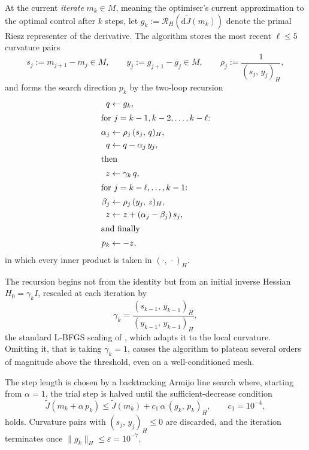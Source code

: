 \documentclass[a4paper,11pt]{article}
\newcommand{\inner}[3]{(#1,\,#2)_{#3}}        %
\newcommand{\Rmap}{\mathcal{R}}              %
\newcommand{\Jt}{\tilde{J}}                  %
\newcommand{\Mspace}{M}
\theoremstyle{spacedplain} \newtheorem{theorem}[counter]{Theorem} \newtheorem{lemma}[counter]{Lemma} \newtheorem{prop}[counter]{Proposition} \newtheorem{cor}[counter]{Corollary}
\theoremstyle{spaceddefinition} \newtheorem{defn}[counter]{Definition} \newtheorem{example}[counter]{Example} \newtheorem{remark}[counter]{Remark}
\begin{document}
At the current \emph{iterate} $m_{k} \in \Mspace$, meaning the optimiser's current approximation to the optimal control after $k$ steps, let $g_{k} := \Rmap_H(\mathrm{d}\Jt(m_{k}))$ denote the primal Riesz representer of the derivative. The algorithm stores the most recent $\ell \le 5$ curvature pairs
\begin{equation}
  s_{j} := m_{j+1} - m_{j} \in \Mspace,
  \qquad
  y_{j} := g_{j+1} - g_{j} \in \Mspace,
  \qquad
  \rho_{j} := \frac{1}{\inner{s_{j}}{y_{j}}{H}},
\end{equation}
and forms the search direction $p_k$ by the two-loop recursion
\begin{align}
  q & \leftarrow g_{k}, \\
  \intertext{for $j = k-1, k-2, \ldots, k-\ell$:}
  \alpha_{j} & \leftarrow \rho_{j}\, \inner{s_{j}}{q}{H}, \\
  q          & \leftarrow q - \alpha_{j}\, y_{j}, \\
  \intertext{then}
  z          & \leftarrow \gamma_{k}\, q, \\
  \intertext{for $j = k-\ell, \ldots, k-1$:}
  \beta_{j}  & \leftarrow \rho_{j}\, \inner{y_{j}}{z}{H}, \\
  z          & \leftarrow z + (\alpha_{j} - \beta_{j})\, s_{j}, \\
  \intertext{and finally}
  p_{k}      & \leftarrow -z,
\end{align}
in which every inner product is taken in $\inner{\cdot}{\cdot}{H}$.

The recursion begins not from the identity but from an initial inverse Hessian $H_{0} = \gamma_{k} I$, rescaled at each iteration by
\begin{equation}
  \label{eq:meshdep:gamma_k}
  \gamma_{k}
  = \frac{\inner{s_{k-1}}{y_{k-1}}{H}}{\inner{y_{k-1}}{y_{k-1}}{H}},
\end{equation}
the standard L-BFGS scaling of \citet[Sect.~1.5.4.2]{shfp2017}, which adapts it to the local curvature. Omitting it, that is taking $\gamma_{k} = 1$, causes the algorithm to plateau several orders of magnitude above the threshold, even on a well-conditioned mesh.

The step length is chosen by a backtracking Armijo line search where, starting from $\alpha = 1$, the trial step is halved until the sufficient-decrease condition
\begin{equation}
  \Jt(m_{k} + \alpha\, p_{k})
    \le \Jt(m_{k})
       + c_{1}\, \alpha\, \inner{g_{k}}{p_{k}}{H},
  \qquad c_{1} = 10^{-4},
\end{equation}
holds. Curvature pairs with $\inner{s_{j}}{y_{j}}{H} \le 0$ are discarded, and the iteration terminates once $\|g_{k}\|_{H} \le \varepsilon = 10^{-7}$.
\end{document}
